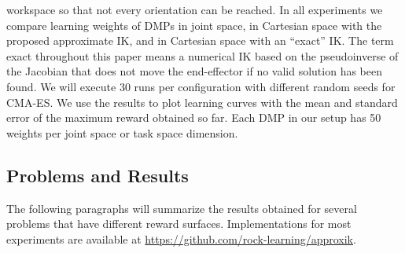 \documentclass{svproc}
\begin{document}
workspace so that not every orientation can be reached. In all experiments
we compare learning weights of DMPs in joint space, in Cartesian space with
the proposed approximate IK, and in Cartesian space with an ``exact'' IK.
The term exact throughout this paper means a numerical IK
based on the pseudoinverse of the Jacobian that does not move the end-effector
if no valid solution has been found.
We will execute 30 runs per configuration with different random seeds for
CMA-ES. We use the results to plot learning curves with the mean and
standard error of the maximum reward obtained so far.
Each DMP in our setup has 50 weights per joint space or task space dimension.

\subsection{Problems and Results}
The following paragraphs will summarize the results obtained for several
problems that have different reward surfaces.
Implementations for most experiments are available at
\url{https://github.com/rock-learning/approxik}.
\end{document}
